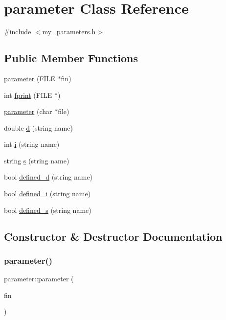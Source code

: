 \hypertarget{classparameter}{}\section{parameter Class Reference}
\label{classparameter}


{\ttfamily \#include $<$my\+\_\+parameters.\+h$>$}

\subsection*{Public Member Functions}
\begin{DoxyCompactItemize}
\item 
\hyperlink{classparameter_a6475ed9b5f1ca53d76cf82241e986b65}{parameter} (F\+I\+LE $\ast$fin)
\item 
int \hyperlink{classparameter_afbef313ca8a9afcdb3d55c15cc26dda9}{fprint} (F\+I\+LE $\ast$)
\item 
\hyperlink{classparameter_ae921d41efdb46c59c86ce23b04401a87}{parameter} (char $\ast$file)
\item 
double \hyperlink{classparameter_a9bde45c6fc27d8ffde9684988c4decee}{d} (string name)
\item 
int \hyperlink{classparameter_aa98e4eadb8cb07d98a6e49ec616552b0}{i} (string name)
\item 
string \hyperlink{classparameter_a96a4648e43ef0e378f5c8cf638df21ee}{s} (string name)
\item 
bool \hyperlink{classparameter_adf70ad9eea8ccf14a49a1c007d8a5d09}{defined\+\_\+d} (string name)
\item 
bool \hyperlink{classparameter_a7b6a19a2092d29e4f7a6dd838f18edff}{defined\+\_\+i} (string name)
\item 
bool \hyperlink{classparameter_a2a48a6fe554cd07b8d2d1859d7aabc90}{defined\+\_\+s} (string name)
\end{DoxyCompactItemize}


\subsection{Constructor \& Destructor Documentation}
\mbox{\label{classparameter_a6475ed9b5f1ca53d76cf82241e986b65}} 
\subsubsection{\texorpdfstring{parameter()}{parameter()}\hspace{0.1cm}{\footnotesize\ttfamily [1/2]}}
{\footnotesize\ttfamily parameter\+::parameter (\begin{DoxyParamCaption}\item[{F\+I\+LE $\ast$}]{fin }\end{DoxyParamCaption})\hspace{0.3cm}{\ttfamily [inline]}}

